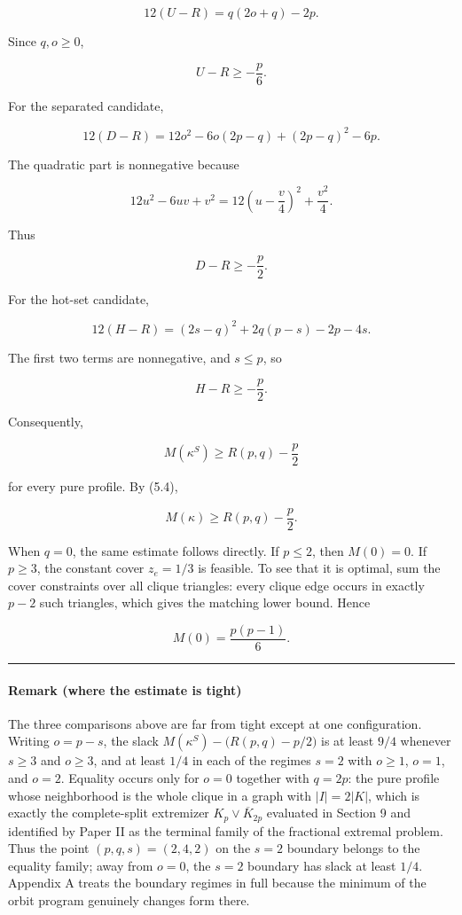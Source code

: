 \documentclass[english,11pt,a4paper]{article}
\begin{document}
\[
12(U-R)
=
q(2o+q)-2p.
\tag{7.2}
\]

Since \(q,o\ge0\),

\[
U-R\ge-\frac p6.
\tag{7.3}
\]

For the separated candidate,

\[
12(D-R)
=
12o^2-6o(2p-q)+(2p-q)^2-6p.
\tag{7.4}
\]

The quadratic part is nonnegative because

\[
12u^2-6uv+v^2
=
12\left(u-\frac v4\right)^2+\frac{v^2}{4}.
\]

Thus

\[
D-R\ge-\frac p2.
\tag{7.5}
\]

For the hot-set candidate,

\[
12(H-R)
=
(2s-q)^2+2q(p-s)-2p-4s.
\tag{7.6}
\]

The first two terms are nonnegative, and \(s\le p\), so

\[
H-R\ge-\frac p2.
\tag{7.7}
\]

Consequently,

\[
M(\kappa^S)
\ge
R(p,q)-\frac p2
\]

for every pure profile. By (5.4),

\[
\boxed{
M(\kappa)
\ge
R(p,q)-\frac p2
}.
\tag{7.8}
\]

When \(q=0\), the same estimate follows directly. If \(p\le2\), then
\(M(0)=0\). If \(p\ge3\), the constant cover \(z_e=1/3\) is feasible. To
see that it is optimal, sum the cover constraints over all clique
triangles: every clique edge occurs in exactly \(p-2\) such triangles,
which gives the matching lower bound. Hence

\[
M(0)=\frac{p(p-1)}6.
\]

\begin{center}\rule{0.5\linewidth}{0.5pt}\end{center}

\paragraph{Remark (where the estimate is
tight)}\label{remark-where-the-estimate-is-tight}

The three comparisons above are far from tight except at one
configuration. Writing \(o=p-s\), the slack
\(M(\kappa^S)-\big(R(p,q)-p/2\big)\) is at least \(9/4\) whenever
\(s\ge3\) and \(o\ge3\), and at least \(1/4\) in each of the regimes
\(s=2\) with \(o\ge1\), \(o=1\), and \(o=2\). Equality occurs only for
\(o=0\) together with \(q=2p\): the pure profile whose neighborhood is
the whole clique in a graph with \(|I|=2|K|\), which is exactly the
complete-split extremizer \(K_p\vee\overline K_{2p}\) evaluated in
Section 9 and identified by Paper II as the terminal family of the
fractional extremal problem. Thus the point \((p,q,s)=(2,4,2)\) on the
\(s=2\) boundary belongs to the equality family; away from \(o=0\), the
\(s=2\) boundary has slack at least \(1/4\). Appendix A treats the
boundary regimes in full because the minimum of the orbit program
genuinely changes form there.
\end{document}
